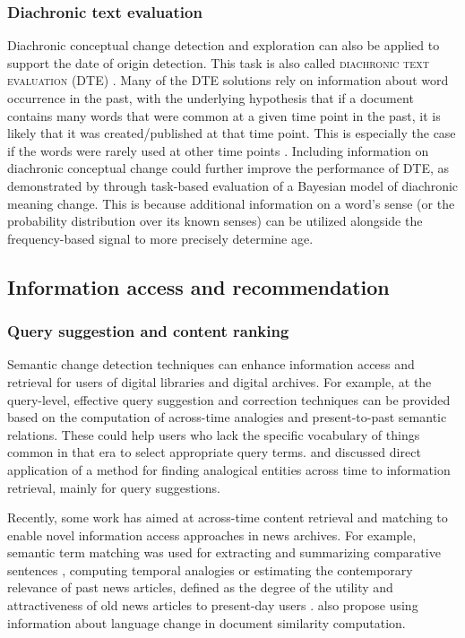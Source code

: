 \documentclass[output=paper]{langsci/langscibook}
\begin{document}
\subsubsection{Diachronic text evaluation} 
Diachronic conceptual change detection and exploration can also be  applied to support the date of origin detection. This task is also called \textsc{diachronic text evaluation} (DTE) \citep{popescu2015semeval}. Many of the DTE solutions rely on  information about word occurrence in the past, with the underlying hypothesis that if a document contains many words that were common at a given time point in the past, it is likely that it was created/published at that time point. This is especially the case if the words were rarely used at other time points \citep[see, e.g.][]{kanhabua2009using, chambers2012labeling,szymanski2015ucd,jatowt2017}. Including information on diachronic conceptual change could further improve the performance of DTE, as demonstrated by \citet{frermann-lapata-2016-bayesian} through task-based evaluation of a Bayesian model of diachronic meaning change. This is because additional information on a word's sense (or the probability distribution over its known senses) can be utilized alongside the frequency-based signal to more precisely determine age.

\subsection{Information access and recommendation}\label{sec9:iar}
\subsubsection{Query suggestion and content ranking} 
Semantic change detection techniques can enhance information access and retrieval for users of digital libraries and digital archives. For example, at the query-level, effective query suggestion and correction techniques can be provided based on the computation of across-time analogies and present-to-past semantic relations. These could help users who lack the specific vocabulary of things common in that era to select appropriate query terms. \citet{berberichbsw09} and \citet{holzmann2012fokas} discussed direct application of a method for finding analogical entities across time to information retrieval, mainly for query suggestions. 

Recently, some work has aimed at across-time content retrieval and matching to enable novel information access approaches in news archives. For example, semantic term matching was used for extracting and summarizing comparative sentences \citep{duan2019across}, computing temporal analogies \citep{zhang-etal-2015-omnia,szymanski:2017} or estimating the contemporary relevance of past news articles, defined as the degree of the utility and attractiveness of old news articles to present-day users \citep{mari}. \citet{morsy2016accounting} also propose using information about language change in document similarity computation.
\end{document}
